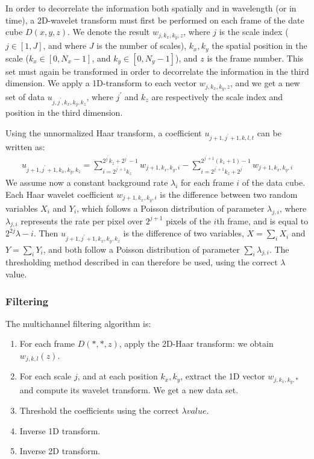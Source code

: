 In order to decorrelate the information both spatially and in wavelength (or in
time), a 2D-wavelet transform
must first be performed on each frame of the date cube $D(x,y,z)$. 
We denote the result $w_{j,k_x,k_y,z}$, 
where $j$ is the scale index ($j \in [1,J]$, and
where $J$ is the number of scales), $k_x,k_y$ the 
spatial position in the scale ($k_x \in [0,N_x-1]$, and $k_y \in [0,N_y-1]$),
 and $z$ is the frame number. 
This set must again be transformed in order to 
decorrelate the information in the third dimension. We apply a 1D-transform
to each vector $w_{j,k_x,k_y,z}$, 
and we get a new set of data $u_{j,j^{'},k_x,k_y,k_z}$,
where $j^{'}$ and $k_z$ are respectively the scale index and position
in the third dimension.

Using the unnormalized Haar transform, 
a coefficient $u_{j+1,j^{'}+1,k,l,t}$ can be written
as:
\begin{eqnarray}
u_{j+1,j^{'}+1,k_x,k_y,k_z} 
   = \sum_{i=2^{j^{'}+1}k_z}^{2^{j^{'}}k_z+2^{j^{'}}-1} w_{j+1,k_x,k_y,i} -
     \sum_{i=2^{j^{'}+1}k_z+2^{j^{'}}}^{2^{j^{'}+1}(k_z+1)-1} w_{j+1,k_x,k_y,i}
\end{eqnarray}
We assume now a constant background rate $\lambda_i$ for each frame $i$ 
of the data cube. 
Each Haar wavelet coefficient $w_{j+1,k_x,k_y,i}$ is the difference between two
random variables $X_i$ and $Y_i$, which follows a Poisson distribution of
parameter $\lambda_{j,i}$, where $\lambda_{j,i}$ represents the rate per
pixel over $2^{j+1}$ pixels of the $i$th frame, and is equal to $2^{2j}\lambda-i$.
Then $u_{j+1,j^{'}+1,k_x,k_y,k_z}$ is the difference of 
 two variables, $X=\sum_i X_i$ and $Y=\sum_i Y_i$, and both follow a Poisson
 distribution of parameter $\sum_i \lambda_{j,i}$.
The thresholding method described in \proj 
can therefore be used, using the correct $\lambda$ value.

\subsubsection*{Filtering}

The multichannel filtering algorithm is:
\begin{enumerate}
\item For each frame $D(*,*,z)$, apply the 2D-Haar transform: we obtain 
$w_{j,k,l}(z)$.
\item For each scale $j$, and at each position $k_x,k_y$, 
extract the 1D vector
 $w_{j,k_x,k_y,*}$ and compute its wavelet transform. We get a new data set.
\item Threshold the coefficients using the correct $\lambda value$.
\item Inverse 1D transform.
\item Inverse 2D transform.
\end{enumerate}

